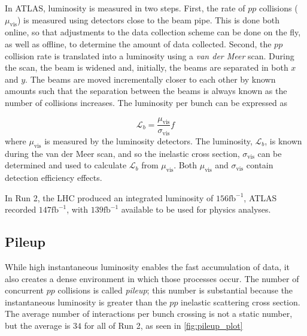 

In \ac{ATLAS}, luminosity is measured in two steps. First, the rate of $pp$ collisions ($\mu_{\textrm{vis}}$) is measured using detectors close to the beam pipe. This is done both online, so that adjustments to the data collection scheme can be done on the fly, as well as offline, to determine the amount of data collected. Second, the $pp$ collision rate is translated into a luminosity using a \emph{van der Meer} scan. During the scan, the beam is widened and, initially, the beams are separated in both $x$ and $y$. The beams are moved incrementally closer to each other by known amounts such that the separation between the beams is always known as the number of collisions increases. \cite{atlas-vdm} The luminosity per bunch can be expressed as

\begin{equation}
\mathcal{L}_b = \frac{\mu_{\textrm{vis}}}{\sigma_{\textrm{vis}}} f
\end{equation}
where $\mu_{\textrm{vis}}$ is measured by the luminosity detectors. The luminosity, $\mathcal{L}_b$, is known during the van der Meer scan, and so the inelastic cross section, $\sigma_{\textrm{vis}}$ can be determined and used to calculate $\mathcal{L}_b$ from $\mu_{\textrm{vis}}$. Both $\mu_{\textrm{vis}}$ and $\sigma_{\textrm{vis}}$ contain detection efficiency effects. \cite{atlas-lumi}

In Run 2, the \ac{LHC} produced an integrated luminosity of $156 \textrm{fb}^{-1}$, \ac{ATLAS} recorded $147 \textrm{fb}^{-1}$, with $139 \textrm{fb}^{-1}$ available to be used for physics analyses.



\subsection{Pileup}

While high instantaneous luminosity enables the fast accumulation of data, it also creates a dense environment in which those processes occur. The number of concurrent $pp$ collisions is called \emph{pileup}; this number is substantial because the instantaneous luminosity is greater than the $pp$ inelastic scattering cross section. The average number of interactions per bunch crossing is not a static number, but the average is $34$ for all of Run 2, as seen in \autoref{fig:pileup_plot}

